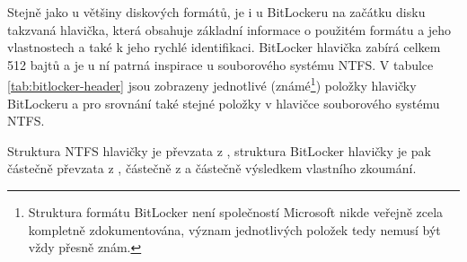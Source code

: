 \label{sec:header}

Stejně jako u většiny diskových formátů, je i u BitLockeru na začátku disku takzvaná hlavička, která obsahuje základní informace o použitém formátu a jeho vlastnostech a také k jeho rychlé identifikaci. BitLocker hlavička zabírá celkem 512 bajtů a je u ní patrná inspirace u souborového systému NTFS. V tabulce \ref{tab:bitlocker-header} jsou zobrazeny jednotlivé (známé\footnote{Struktura formátu BitLocker není společností Microsoft nikde veřejně zcela kompletně zdokumentována, význam jednotlivých položek tedy nemusí být vždy přesně znám.}) položky hlavičky BitLockeru a pro srovnání také stejné položky v hlavičce souborového systému NTFS.

Struktura NTFS hlavičky je převzata z \cite{Carrier2005}, struktura BitLocker hlavičky je pak částečně převzata z \cite{Metz2011}, částečně z \cite{Ferguson2006} a částečně výsledkem vlastního zkoumání.

